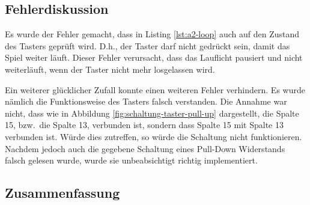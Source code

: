 \subsection{Fehlerdiskussion}
\label{subsec:a2-fehlerdiskussion}

Es wurde der Fehler gemacht, dass in Listing \ref{lst:a2-loop} auch auf den Zustand des Tasters geprüft wird.
D.h., der Taster darf nicht gedrückt sein, damit das Spiel weiter läuft.
Dieser Fehler verursacht, dass das Lauflicht pausiert und nicht weiterläuft, wenn der Taster nicht mehr losgelassen wird.

Ein weiterer glücklicher Zufall konnte einen weiteren Fehler verhindern.
Es wurde nämlich die Funktionsweise des Tasters falsch verstanden.
Die Annahme war nicht, dass wie in Abbildung \ref{fig:schaltung-taster-pull-up} dargestellt, die Spalte 15, bzw.\ die Spalte 13,  verbunden ist, sondern dass Spalte 15 mit Spalte 13 verbunden ist.
Würde dies zutreffen, so würde die Schaltung nicht funktionieren.
Nachdem jedoch auch die gegebene Schaltung eines Pull-Down Widerstands falsch gelesen wurde, wurde sie unbeabsichtigt richtig implementiert.

\subsection{Zusammenfassung}
\label{subsec:a2-zusammenfassung}
